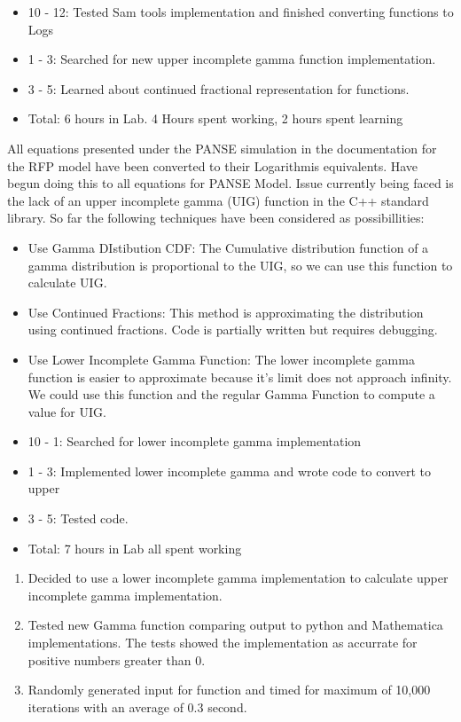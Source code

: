 \documentclass[12pt,hyperref]{labbook}
\begin{document}
\begin{itemize}
	\item 10 - 12: Tested Sam tools implementation and finished converting functions to Logs
	\item 1 - 3: Searched for new upper incomplete gamma function implementation.
	\item 3 - 5: Learned about continued fractional representation for functions.
	\item Total: 6 hours in Lab. 4 Hours spent working, 2 hours spent learning
\end{itemize}
All equations presented under the PANSE simulation in the documentation for the RFP model have been converted to their Logarithmis equivalents.
Have begun doing this to all equations for PANSE Model. Issue currently being faced is the lack of an upper incomplete gamma (UIG) function in the C++ standard library. So far the following techniques have been considered as possibillities:
\begin{itemize}
	\item Use Gamma DIstibution CDF: The Cumulative distribution function of a gamma distribution is proportional to the UIG, so we can use this function to calculate UIG.
	\item Use Continued Fractions: This method is approximating the distribution using continued fractions. Code is partially written but requires debugging.
	\item Use Lower Incomplete Gamma Function: The lower incomplete gamma function is easier to approximate because it's limit does not approach infinity. We could use this function and the regular Gamma Function to compute a value for UIG.
\end{itemize}

\begin{itemize}
	\item 10 - 1: Searched for lower incomplete gamma implementation
	\item 1 - 3: Implemented lower incomplete gamma and wrote code to convert to upper
	\item 3 - 5: Tested code.
	\item Total: 7 hours in Lab all spent working
\end{itemize}
\begin{enumerate}
	\item Decided to use a lower incomplete gamma implementation to calculate upper incomplete gamma implementation.
	\item Tested new Gamma function comparing output to python and Mathematica implementations. The tests showed the implementation as accurrate for positive numbers greater than 0.
	\item Randomly generated input for function and timed for maximum of 10,000 iterations with an average of 0.3 second.
\end{enumerate}
\end{document}
